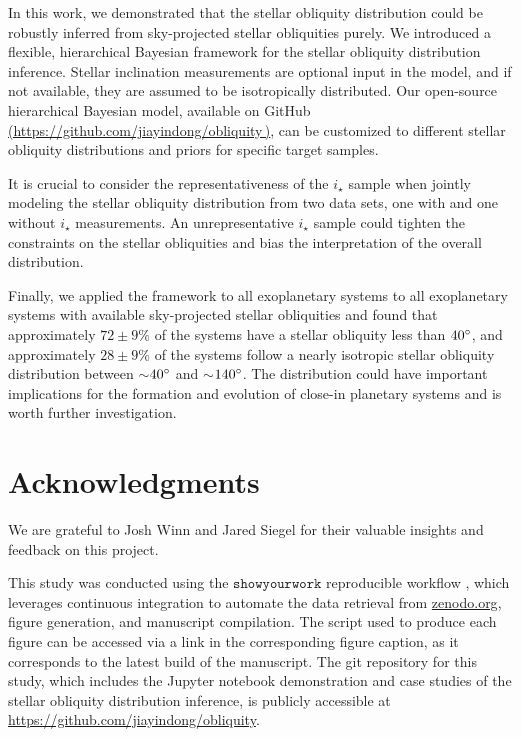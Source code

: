 \documentclass[twocolumn,times,linenumbers]{aastex631}
\begin{document}
In this work, we demonstrated that the stellar obliquity distribution could be robustly inferred from sky-projected stellar obliquities purely.
We introduced a flexible, hierarchical Bayesian framework for the stellar obliquity distribution inference. Stellar inclination measurements are optional input in the model, and if not available, they are assumed to be isotropically distributed.
Our open-source hierarchical Bayesian model, available on GitHub \href{https://github.com/jiayindong/obliquity}{(https://github.com/jiayindong/obliquity\,\faGithub)}, can be customized to different stellar obliquity distributions and priors for specific target samples.

It is crucial to consider the representativeness of the $i_\star$ sample when jointly modeling the stellar obliquity distribution from two data sets, one with and one without $i_\star$ measurements. An unrepresentative $i_\star$ sample could tighten the constraints on the stellar obliquities and bias the interpretation of the overall distribution.

Finally, we applied the framework to all exoplanetary systems to all exoplanetary systems with available sky-projected stellar obliquities and found that approximately $72\pm9$\% of the systems have a stellar obliquity less than $40\mbox{$^\circ$}$, and approximately $28\pm9$\% of the systems follow a nearly isotropic stellar obliquity distribution between $\sim$$40\mbox{$^\circ$}$ and $\sim$$140\mbox{$^\circ$}$.
The distribution could have important implications for the formation and evolution of close-in planetary systems and is worth further investigation.

\section*{Acknowledgments}
We are grateful to Josh Winn and Jared Siegel for their valuable insights and feedback on this project.

This study was conducted using the \href{https://github.com/showyourwork/showyourwork}{$\mathtt{showyourwork}$} reproducible workflow \citep{Luger2021}, which leverages continuous integration to automate the data retrieval from \href{https://zenodo.org/}{zenodo.org}, figure generation, and manuscript compilation.
The script used to produce each figure can be accessed via a link in the corresponding figure caption, as it corresponds to the latest build of the manuscript.
The git repository for this study, which includes the Jupyter notebook demonstration and case studies of the stellar obliquity distribution inference, is publicly accessible at \url{https://github.com/jiayindong/obliquity}.

\vspace*{5mm}



\end{document}
